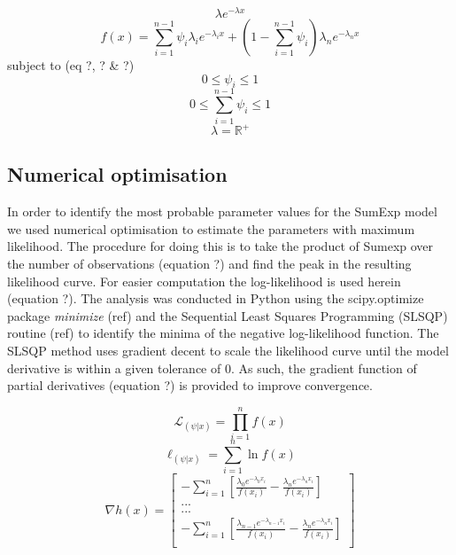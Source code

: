 \documentclass[11pt,usenames,dvipsnames,a4paper]{article}
\newcommand{\Lagr}{\mathcal{L}}
\begin{document}
\begin{equation}
\lambda e^{-\lambda x}
\end{equation}
\begin{equation}
f(x) = \sum_{i=1}^{n-1} \psi_i \lambda_i e^{-\lambda_i x} + \left(1 - \sum_{i=1}^{n-1}\psi_i\right) \lambda_n e^{-\lambda_n x}
\end{equation}
subject to (eq ?, ? \& ?)
\begin{equation}
0\leq \psi_i \leq 1
\end{equation}
\begin{equation}
0\leq \sum_{i=1}^{n-1}\psi_i \leq 1
\end{equation}
\begin{equation}
\lambda = \mathbb{R}^+
\end{equation}

\subsection{Numerical optimisation}

\begin{linenumbers}
\hspace{\parindent}
In order to identify the most probable parameter values for the SumExp model we used numerical optimisation to estimate the parameters with maximum likelihood. The procedure for doing this is to take the product of Sumexp over the number of observations (equation ?) and find the peak in the resulting likelihood curve. For easier computation the log-likelihood is used herein (equation ?). The analysis was conducted in Python using the scipy.optimize package \textit{minimize} (ref) and the Sequential Least Squares Programming (SLSQP) routine (ref) to identify the minima of the negative log-likelihood function. The SLSQP method uses gradient decent to scale the likelihood curve until the model derivative is within a given tolerance of 0. As such, the gradient function of partial derivatives (equation ?) is provided to improve convergence.
\end{linenumbers}
\begin{equation}
\Lagr_{(\psi|x)} = \prod_{i=1}^{n} f(x)
\end{equation} 
\begin{equation}
\ell_{(\psi|x)} = \sum_{i=1}^{n} \ln f(x)
\end{equation} 
\begin{equation}
\nabla h(x) = \begin{bmatrix} -\sum_{i=1}^{n} [\frac{\lambda_0 e^{-\lambda_0 x_i}}{f(x_i)} - \frac{\lambda_n e^{-\lambda_n x_i}}{f(x_i)}] \\
... \\
... \\
-\sum_{i=1}^{n} [\frac{\lambda_{n-1} e^{-\lambda_{n-1} x_i}}{f(x_i)} - \frac{\lambda_n e^{-\lambda_n x_i}}{f(x_i)}] \\
\end{bmatrix}
\end{equation}
\end{document}
